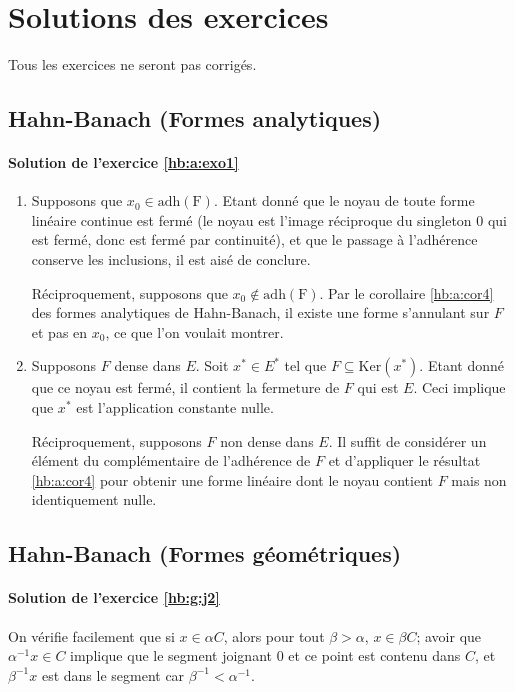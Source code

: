 \chapter{Solutions des exercices}
Tous les exercices ne seront pas corrigés.

\section{Hahn-Banach (Formes analytiques)}
\subsubsection*{Solution de l'exercice \ref{hb:a:exo1}}

\begin{enumerate}
\item Supposons que $x_0\in \mathrm{adh(F)}$.
  Etant donné que le noyau de toute forme linéaire
  continue est fermé (le noyau est l'image réciproque du singleton
  0 qui est fermé, donc est fermé par continuité), et que le passage
  à l'adhérence conserve les inclusions, il est aisé de conclure.

  Réciproquement, supposons que $x_0\notin \mathrm{adh(F)}$.
  Par le corollaire \ref{hb:a:cor4} des formes analytiques de
  Hahn-Banach, il existe une forme s'annulant sur $F$ et pas
  en $x_0$, ce que l'on voulait montrer.
\item Supposons $F$ dense dans $E$. Soit $x^*\in E^*$ tel
  que $F\subseteq\mathrm{Ker}(x^*)$. Etant donné que ce
  noyau est fermé, il contient la fermeture de $F$ qui
  est $E$. Ceci implique que $x^*$ est l'application
  constante nulle.

  Réciproquement, supposons $F$ non dense dans $E$.
  Il suffit de considérer un élément du complémentaire
  de l'adhérence de $F$ et d'appliquer le résultat \ref{hb:a:cor4}
  pour obtenir une forme linéaire dont le noyau contient
  $F$ mais non identiquement nulle.
\end{enumerate}

\section{Hahn-Banach (Formes géométriques)}
\subsubsection*{Solution de l'exercice \ref{hb:g:j2}}
On vérifie facilement que si $x\in \alpha C$, alors pour tout
$\beta >\alpha$, $x\in \beta C$;
avoir que $\alpha^{-1}x\in C$ implique que le segment joignant $0$ et ce
point est contenu dans $C$, et $\beta^{-1}x$ est dans le segment car
$\beta^{-1} <\alpha^{-1}$.

